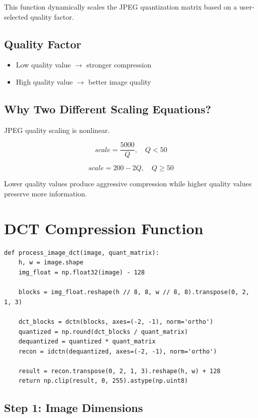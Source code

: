 \documentclass[12pt,a4paper]{article}
\begin{document}
This function dynamically scales the JPEG quantization matrix based on a user-selected quality factor.

\subsection{Quality Factor}

\begin{itemize}
    \item Low quality value $\rightarrow$ stronger compression
    \item High quality value $\rightarrow$ better image quality
\end{itemize}

\subsection{Why Two Different Scaling Equations?}

JPEG quality scaling is nonlinear.

\[
scale = \frac{5000}{Q}, \quad Q < 50
\]

\[
scale = 200 - 2Q, \quad Q \geq 50
\]

Lower quality values produce aggressive compression while higher quality values preserve more information.

\section{DCT Compression Function}

\begin{lstlisting}
def process_image_dct(image, quant_matrix):
    h, w = image.shape
    img_float = np.float32(image) - 128

    blocks = img_float.reshape(h // 8, 8, w // 8, 8).transpose(0, 2, 1, 3)

    dct_blocks = dctn(blocks, axes=(-2, -1), norm='ortho')
    quantized = np.round(dct_blocks / quant_matrix)
    dequantized = quantized * quant_matrix
    recon = idctn(dequantized, axes=(-2, -1), norm='ortho')

    result = recon.transpose(0, 2, 1, 3).reshape(h, w) + 128
    return np.clip(result, 0, 255).astype(np.uint8)
\end{lstlisting}

\subsection{Step 1: Image Dimensions}
\end{document}
